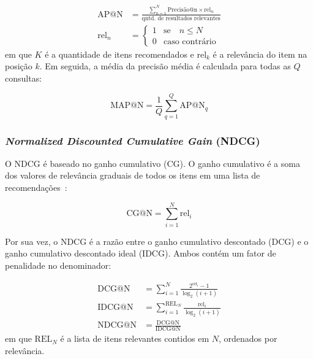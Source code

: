   \begin{align}
    \text{AP@N} &= \frac{\sum_{n = 1}^{N}\text{Precisão@n} \times \text{rel}_{n}}{\text{qntd. de resultados relevantes}} \\
    \text{rel}_n &= \begin{cases}
      1 & \text{se} \quad n \leq N \\
      0 & \text{caso contrário} 
    \end{cases}
  \end{align}
  em que $K$ é a quantidade de itens recomendados e $\text{rel}_{k}$ é a
  relevância do item na posição $k$. Em seguida, a média da precisão média é
  calculada para todas as $Q$ consultas:

  \begin{equation}
    \text{MAP@N} = \frac{1}{Q}\sum_{q = 1}^{Q} \text{AP@N}_{q}
  \end{equation}
  


  \subsubsection{\textit{Normalized Discounted Cumulative Gain} (NDCG)}
  O NDCG é baseado no ganho cumulativo (CG). O ganho cumulativo é a soma dos
  valores de relevância graduais de todos os itens em uma lista de
  recomendações~\cite{carnevali2023offline}:

  \begin{equation}
    \text{CG@N} = \sum_{i = 1}^{N} \text{rel}_{i}
  \end{equation}
  
  Por sua vez, o NDCG é a razão entre o ganho cumulativo
  descontado (DCG) e o ganho cumulativo descontado ideal (IDCG). Ambos contém
  um fator de penalidade no denominador:

  \begin{align}
    \text{DCG@N} &= \sum_{i = 1}^{N} \frac{2^{\text{rel}_{i}} - 1}{\log_{2}(i + 1)} \\
    \text{IDCG@N} &= \sum_{i = 1}^{\text{REL}_N} \frac{\text{rel}_{i}}{{\log_{2}(i + 1)}} \\
    \text{NDCG@N} &= \frac{\text{DCG@N}}{\text{IDCG@N}}
  \end{align}
  em que $\text{REL}_N$ é a lista de itens relevantes contidos em $N$, ordenados
  por relevância.



